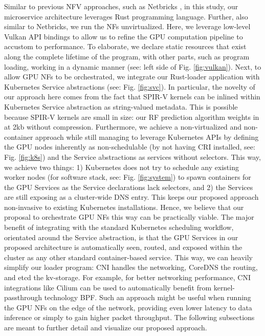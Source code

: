 \documentclass{IEEEtran}
\begin{document}
Similar to previous \gls{NFV} approaches, such as Netbricks \cite{panda2016netbricks}, in this study, our microservice architecture leverages Rust programming language. Further, also similar to Netbricks, we run the \glspl{NF} unvirtualized. Here, we leverage low-level Vulkan \gls{API} bindings to allow us to refine the GPU computation pipeline to accustom to performance. To elaborate, we declare static resources that exist along the complete lifetime of the program, with other parts, such as program loading, working in a dynamic manner (see: left side of Fig. \ref{fig:vulkan}). Next, to allow GPU NFs to be orchestrated, we integrate our Rust-loader application with Kubernetes Service abstractions (see: Fig. \ref{fig:svc}). In particular, the novelty of our approach here comes from the fact that SPIR-V kernels can be inlined within Kubernetes Service abstraction as string-valued metadata. This is possible because SPIR-V kernels are small in size: our RF prediction algorithm weights in at 2kb without compression. Furthermore, we achieve a non-virtualized and non-container approach while still managing to leverage Kubernetes APIs by defining the GPU nodes inherently as non-schedulable (by not having \gls{CRI} installed, see: Fig. \ref{fig:k8s}) and the Service abstractions as services without selectors. This way, we achieve two things: 1) Kubernetes does not try to schedule any existing worker nodes (for software stack, see: Fig. \ref{fig:system}) to spawn containers for the GPU Services as the Service declarations lack selectors, and 2) the Services are still exposing as a cluster-wide \gls{DNS} entry. This keeps our proposed approach non-invasive to existing Kubernetes installations. Hence, we believe that our proposal to orchestrate GPU NFs this way can be practically viable. The major benefit of integrating with the standard Kubernetes scheduling workflow, orientated around the Service abstraction, is that the GPU Services in our proposed architecture is automatically seen, routed, and exposed within the cluster as any other standard container-based service. This way, we can heavily simplify our loader program: \gls{CNI} handles the networking, CoreDNS the routing, and etcd the kv-storage. For example, for better networking performance, CNI integrations like Cilium can be used to automatically benefit from kernel-passthrough technology \gls{BPF}. Such an approach might be useful when running the GPU NFs on the edge of the network, providing even lower latency to data inference or simply to gain higher packet throughput. The following subsections are meant to further detail and visualize our proposed approach.
\end{document}
